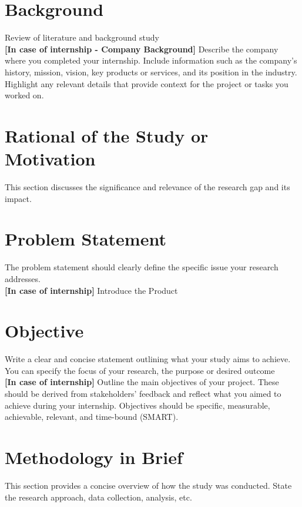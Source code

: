 \section{Background} 
Review of literature and background study \\

\textbf{[In case of internship - Company Background]}
Describe the company where you completed your internship. Include information such as the company’s history, mission, vision, key products or services, and its position in the industry. Highlight any relevant details that provide context for the project or tasks you worked on.

\section{Rational of the Study or Motivation}
This section discusses the significance and relevance of the research gap and its impact.

\section{Problem Statement}
The problem statement should clearly define the specific issue your research addresses.\\

\textbf{[In case of internship]} Introduce the Product

\section{Objective}
Write a clear and concise statement outlining what your study aims to achieve. You can specify the focus of your research, the purpose or desired outcome\\

\textbf{[In case of internship]}
Outline the main objectives of your project. These should be derived from stakeholders' feedback and reflect what you aimed to achieve during your internship. Objectives should be specific, measurable, achievable, relevant, and time-bound (SMART).
\section{Methodology in Brief }

This section provides a concise overview of how the study was conducted. State the research approach, data collection, analysis, etc.


